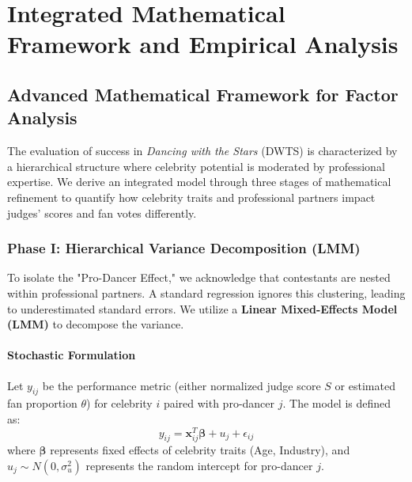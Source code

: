 \documentclass[12pt]{article}
\begin{document}



\section{Integrated Mathematical Framework and Empirical Analysis}


\subsection{Advanced Mathematical Framework for Factor Analysis}

The evaluation of success in \textit{Dancing with the Stars} (DWTS) is characterized by a hierarchical structure where celebrity potential is moderated by professional expertise. We derive an integrated model through three stages of mathematical refinement to quantify how celebrity traits and professional partners impact judges' scores and fan votes differently.

\subsubsection{Phase I: Hierarchical Variance Decomposition (LMM)}

To isolate the "Pro-Dancer Effect," we acknowledge that contestants are nested within professional partners. A standard regression ignores this clustering, leading to underestimated standard errors. We utilize a \textbf{Linear Mixed-Effects Model (LMM)} to decompose the variance.

\paragraph{Stochastic Formulation}
Let $y_{ij}$ be the performance metric (either normalized judge score $S$ or estimated fan proportion $\theta$) for celebrity $i$ paired with pro-dancer $j$. The model is defined as:
\begin{equation}
    y_{ij} = \mathbf{x}_{ij}^T \bm{\beta} + u_j + \epsilon_{ij}
\end{equation}
where $\bm{\beta}$ represents fixed effects of celebrity traits (Age, Industry), and $u_j \sim N(0, \sigma_u^2)$ represents the random intercept for pro-dancer $j$.
\end{document}
